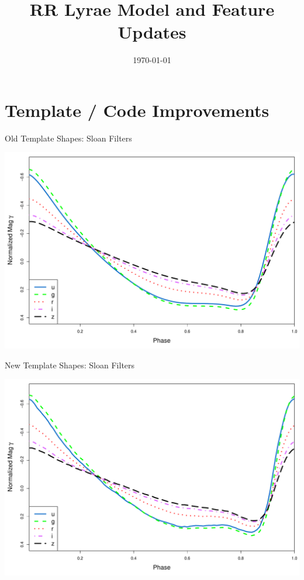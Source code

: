 \documentclass[12pt]{beamer}
\title{RR Lyrae Model and Feature Updates}
\date{\today}
\begin{document}
\frame{\titlepage}





\section{Template / Code Improvements}

\begin{frame}{Old Template Shapes: Sloan Filters}
  \begin{center}
    \includegraphics[scale=0.35]{figs/sdss_templates_old.pdf}
  \end{center}
\end{frame}


\begin{frame}{New Template Shapes: Sloan Filters}
  \begin{center}
    \includegraphics[scale=0.35]{figs/sdss_templates.pdf}
  \end{center}
\end{frame}
\end{document}
